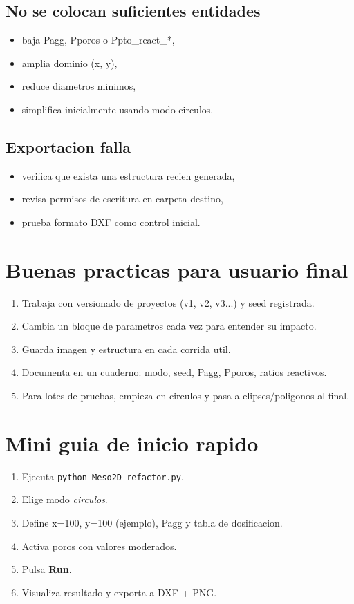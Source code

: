 \documentclass[11pt,a4paper]{article}
\begin{document}
\subsection{No se colocan suficientes entidades}
\begin{itemize}[leftmargin=1.5em]
  \item baja Pagg, Pporos o Ppto\_react\_*,
  \item amplia dominio (x, y),
  \item reduce diametros minimos,
  \item simplifica inicialmente usando modo circulos.
\end{itemize}

\subsection{Exportacion falla}
\begin{itemize}[leftmargin=1.5em]
  \item verifica que exista una estructura recien generada,
  \item revisa permisos de escritura en carpeta destino,
  \item prueba formato DXF como control inicial.
\end{itemize}

\section{Buenas practicas para usuario final}
\begin{enumerate}[leftmargin=1.7em]
  \item Trabaja con versionado de proyectos (v1, v2, v3...) y seed registrada.
  \item Cambia un bloque de parametros cada vez para entender su impacto.
  \item Guarda imagen y estructura en cada corrida util.
  \item Documenta en un cuaderno: modo, seed, Pagg, Pporos, ratios reactivos.
  \item Para lotes de pruebas, empieza en circulos y pasa a elipses/poligonos al final.
\end{enumerate}

\section{Mini guia de inicio rapido}
\begin{enumerate}[leftmargin=1.7em]
  \item Ejecuta \texttt{python Meso2D\_refactor.py}.
  \item Elige modo \textit{circulos}.
  \item Define x=100, y=100 (ejemplo), Pagg y tabla de dosificacion.
  \item Activa poros con valores moderados.
  \item Pulsa \textbf{Run}.
  \item Visualiza resultado y exporta a DXF + PNG.
\end{enumerate}
\end{document}
